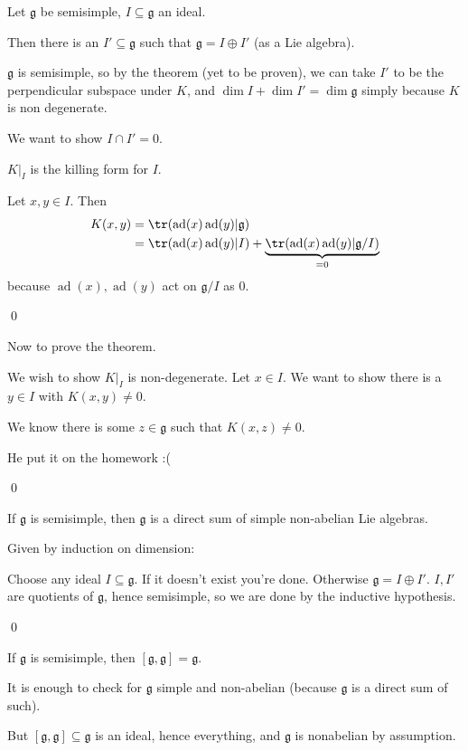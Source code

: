 \documentclass[x11names,reqno,14pt]{extarticle}
\newcommand{\mk}[1]{\mathfrak{#1}}
\newcommand{\g}{\mk{g}}
\DeclareMathOperator{\ad}{ad}
\begin{document}
Let $\g$ be semisimple, $I \subseteq \g$ an ideal. 

Then there is an $I'\subseteq\g$ such that $\g = I\oplus I'$ (as a Lie algebra).

\proof

$\g$ is semisimple, so by the theorem (yet to be proven), we can take $I'$ to be the perpendicular subspace under $K$, and $\dim I + \dim I' = \dim \g$ simply because $K$ is non degenerate. 

We want to show $I \cap I' = 0$. 

\claim 

$K|_I$ is the killing form for $I$. 

\proof

Let $x, y \in I$. Then
\begin{align*}
K(x,y) & = \tr(\ad(x)\ad(y)|\g) \\
& = \tr(\ad(x)\ad(y)|I) + \underbrace{\tr(\ad(x)\ad(y)|\g/ I)}_{=0}
\end{align*}
because $\ad(x),\ad(y)$ act on $\g/I$ as 0. 

\qed

Now to prove the theorem. 

We wish to show $K|_I$ is non-degenerate. Let $x \in I$. We want to show there is a $y \in I$ with $K(x,y) \neq 0$. 

We know there is some $z \in \g$ such that $K(x,z) \neq 0$. 

He put it on the homework :(

\qed

\cor

If $\g$ is semisimple, then $\g$ is a direct sum of simple non-abelian Lie algebras. 

\proof

Given by induction on dimension: 

Choose any ideal $I \subseteq \g$. If it doesn't exist you're done. Otherwise $\g = I \oplus I'$. $I, I'$ are quotients of $\g$, hence semisimple, so we are done by the inductive hypothesis. 

\qed

\cor

If $\g$ is semisimple, then $[\g,\g] = \g$. 

\proof

It is enough to check for $\g$ simple and non-abelian (because $\g$ is a direct sum of such). 

But $[\g,\g] \subseteq \g$ is an ideal, hence everything, and $\g$ is nonabelian by assumption. 
\end{document}
